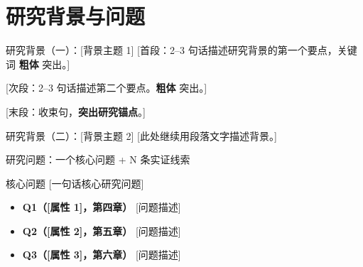 \documentclass[10pt,aspectratio=169]{beamer}
\begin{document}
\section{研究背景与问题}


\begin{frame}{研究背景（一）：[背景主题 1]}
  [首段：2--3 句话描述研究背景的第一个要点，关键词 \textbf{粗体} 突出。]

  \vspace{0.4em}
  [次段：2--3 句话描述第二个要点。\textbf{粗体} 突出。]

  \vspace{0.4em}
  [末段：收束句，\textbf{突出研究锚点}。]
\end{frame}

\begin{frame}{研究背景（二）：[背景主题 2]}
  [此处继续用段落文字描述背景。]
\end{frame}


\begin{frame}{研究问题：一个核心问题 + N 条实证线索}
  \begin{block}{核心问题}
    [一句话核心研究问题]
  \end{block}

  \vspace{0.4em}
  \begin{itemize}
    \item \textbf{Q1（[属性 1]，第四章）} [问题描述]
    \item \textbf{Q2（[属性 2]，第五章）} [问题描述]
    \item \textbf{Q3（[属性 3]，第六章）} [问题描述]
  \end{itemize}
\end{frame}

\end{document}
